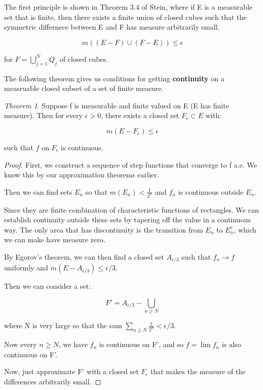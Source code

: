 \documentclass[class=article, crop=false]{standalone}
\theoremstyle{definition}
\theoremstyle{remark}
\theoremstyle{lemma}
\theoremstyle{theorem}
\newtheorem*{theorem}{Theorem}
\theoremstyle{corollary}
\theoremstyle{property}
\begin{document}
			The first principle is shown in Theorem 3.4 of Stein, where if E is a measurable set that is finite, then there exists a finite union of closed cubes such that the symmetric differnece between E and F has measure arbitrarily small.

				$$m((E-F) \cup (F-E)) \le \epsilon$$

			for $F = \bigcup_{j=1}^N Q_j$ of closed cubes.

			The following theorem gives us conditions for getting \textbf{continuity} on a measruable closed subset of a set of finite measure.
			\begin{theorem}
			\label{thm:lusins}
				Suppose f is measurable and finite valued on E (E has finite measure). Then for every $\epsilon > 0$, there exists a closed set $F_\epsilon \subset E$ with:

					$$m(E - F_\epsilon) \le \epsilon$$

				such that $f$ on $F_\epsilon$ is continuous. 
			\end{theorem}
			\begin{proof}
				First, we construct a sequence of step functions that converge to f a.e. We know this by our approximation theorems earlier.

				Then we can find sets $E_n$ so that $m(E_n) < \frac{1}{2^n}$ and $f_n$ is continuous outside $E_n$. 

				Since they are finite combination of characteristic functions of rectangles. We can establish continuity outside these sets by tapering off the value in a continuous way. The only area that has discontinuity is the transition from $E_n$ to $E_n^c$, which we can make have measure zero.

				By Egorov's theorem, we can then find a closed set $A_{\epsilon / 3}$ such that $f_n \rightarrow f$ uniformly and $m(E - A_{\epsilon / 3}) \le \epsilon / 3$. 

				Then we can consider a set:

					$$F' = A_{\epsilon / 3} - \bigcup_{n \ge N}$$

				where N is very large so that the sum $\sum_{n \ge N} \frac{1}{2^n} < \epsilon / 3$. 

				Now every $n \ge N$, we have $f_n$ is continuous on F', and so $f = \lim f_n$ is also continuous on F'. 

				Now, just approximate F' with a closed set $F_\epsilon$ that makes the measure of the differences arbitrarily small.
			\end{proof}
\end{document}
